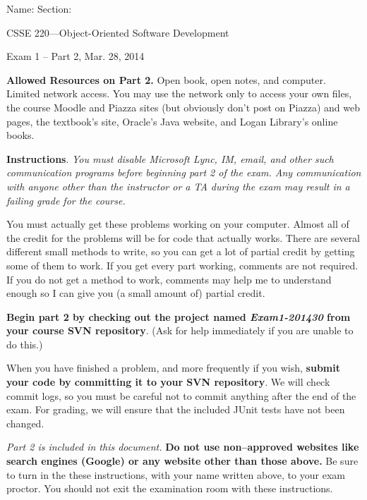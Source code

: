 \documentclass[12pt,twoside]{article}
\newcommand{\fillInBlank}[1][0.5in]{\underline{\hspace{#1}}}
\begin{document}

\begin{flushright}
Name: \fillInBlank[3in] Section: \fillInBlank[1in]

\LARGE{CSSE 220---Object-Oriented Software Development}

\Large{Exam 1 -- Part 2, Mar. 28, 2014}
\end{flushright}

\textbf{Allowed Resources on Part 2.} \hspace{0.15in}
Open book, open notes, and computer. Limited network access. You may use the network only to access your own files, the course Moodle and Piazza sites (but obviously don't post on Piazza) and web pages, the textbook's site, Oracle's Java website, and Logan Library's online books.


\textbf{Instructions}.\hspace{0.15in}
\emph{You must disable Microsoft Lync, IM, email, and other such communication programs
before beginning part 2 of the exam. Any communication with anyone other than the instructor
or a TA during the exam may result in a failing grade for the course.}

You must actually get these problems working on your computer. Almost all of the credit for the problems will be for code that actually works. There are several different small methods to write, so you can get a lot of partial credit by getting some of them to work.  If you get every part working, comments are not required.  If you do not get a method to work, comments may help me to understand enough so I can give you (a small amount of) partial credit.  

\textbf{Begin part 2 by checking out the project named \emph{Exam1-201430} from your course SVN repository}.  (Ask for help immediately if you are unable to do this.)

When you have finished a problem, and more frequently if you wish, \textbf{submit your code by committing it to your SVN repository}.  We will check commit logs, so you must be careful not to commit anything after the end of the exam.  For grading, we will ensure that the included JUnit tests have not been changed.

\emph{Part 2 is included in this document.}
\textbf{Do not use non--approved websites like search engines (Google) or any website other than those above.}  Be sure to turn in the these instructions, with your name written above, to your exam proctor. You should not exit the examination room with these instructions.
\end{document}
